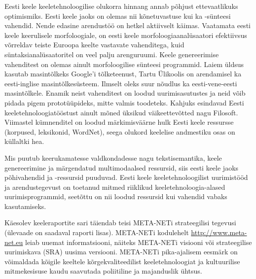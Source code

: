 \documentclass[]{../metanetpaper}
\begin{document}
\begin{multicols}{2}
Eesti keele keeletehnoloogilise olukorra hinnang annab põhjust ettevaatlikuks optimismiks.
Eesti keele jaoks on olemas nii kõnetuvastuse kui ka -sünteesi vahendid. Nende edasine arendustöö on hetkel aktiivselt käimas. 
Vaatamata eesti keele keerulisele morfoloogiale, on eesti keele morfoloogiaanalüsaatori efektiivsus võrreldav teiste Euroopa keelte vastavate vahenditega, kuid süntaksianalüsaatoritel on veel palju arenguruumi. 
Keele genereerimise vahenditest on olemas ainult morfoloogilise sünteesi programmid.
Laiem üldsus kasutab masintõlkeks Google'i tõlketeenust, Tartu Ülikoolis on arendamisel ka eesti-inglise masintõlkesüsteem. Ilmselt oleks suur nõudlus ka eesti-vene-eesti masintõlkele.
Enamik neist vahenditest on loodud uurimisasutustes ja neid võib pidada pigem prototüüpideks, mitte valmis toodeteks. Kahjuks esindavad Eesti keeletehnoloogiatööstust ainult mõned üksikud väikeettevõtted nagu Filosoft.
Viimastel kümnenditel on loodud märkimisväärne hulk Eesti keele ressursse (korpused, leksikonid, WordNet), seega olukord keelelise andmestiku osas on küllaltki hea. 


Mis puutub keerukamatesse valdkondadesse nagu tekstisemantika, keele genereerimine ja märgendatud multimodaalsed ressursid, siis eesti keele jaoks põhivahendid ja -ressursid puuduvad. 
Eesti keele keeletehnoloogilist uurimistööd ja arendustegevust on toetanud mitmed riiklikud keeletehnoloogia-alased uurimisprogrammid, seetõttu on nii loodud ressursid kui vahendid vabaks kasutamiseks. 

Käesolev keeleraportite sari täiendab teisi META-NETi strateegilisi tegevusi (ülevaade on saadaval raporti lisas). 
META-NETi kodulehelt \url{http://www.meta-net.eu} leiab uuemat
informatsiooni, näiteks META-NETi visiooni \cite{Meta1} või
strateegilise uurimis\-kava (SRA) uusima versiooni. 
META-NETi pika-ajalisem eesmärk on võimaldada kõigile keeltele kõrgekvaliteedilist keeletehnoloogiat ja kultuurilise mitmekesisuse kaudu saavutada poliitiline ja majanduslik ühtsus. 

\end{multicols}
\end{document}
